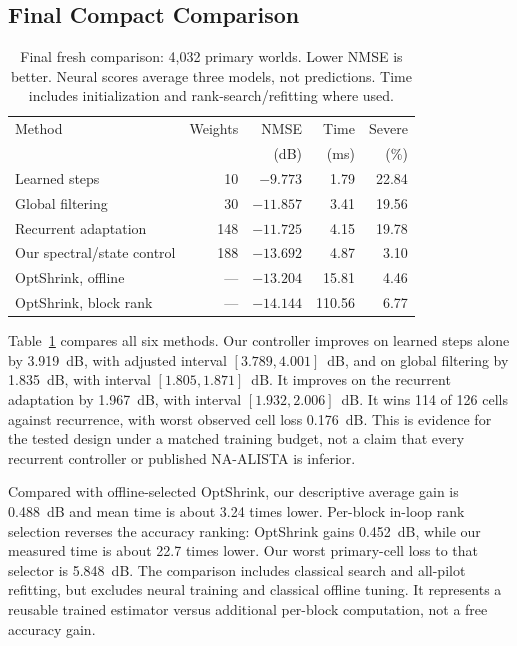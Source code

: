 \documentclass[10pt,journal,letterpaper]{IEEEtran}
\begin{document}
\subsection{Final Compact Comparison}
\begin{table}[!t]
\caption{Final fresh comparison: 4,032 primary worlds. Lower NMSE is better. Neural scores average three models, not predictions. Time includes initialization and rank-search/refitting where used.}
\label{tab:compact}\centering\footnotesize\setlength{\tabcolsep}{3pt}
\begin{tabular}{@{}lrrrr@{}}\toprule
Method & Weights & NMSE & Time & Severe\\
 & & (dB) & (ms) & (\%)\\\midrule
Learned steps & 10 & $-9.773$ & 1.79 & 22.84\\
Global filtering & 30 & $-11.857$ & 3.41 & 19.56\\
Recurrent adaptation & 148 & $-11.725$ & 4.15 & 19.78\\
Our spectral/state control & 188 & $-13.692$ & 4.87 & 3.10\\
OptShrink, offline & --- & $-13.204$ & 15.81 & 4.46\\
OptShrink, block rank & --- & $-14.144$ & 110.56 & 6.77\\\bottomrule
\end{tabular}
\end{table}
Table~\ref{tab:compact} compares all six methods. Our controller improves on learned steps alone by 3.919~dB, with adjusted interval $[3.789,4.001]$~dB, and on global filtering by 1.835~dB, with interval $[1.805,1.871]$~dB. It improves on the recurrent adaptation by 1.967~dB, with interval $[1.932,2.006]$~dB. It wins 114 of 126 cells against recurrence, with worst observed cell loss 0.176~dB. This is evidence for the tested design under a matched training budget, not a claim that every recurrent controller or published NA-ALISTA is inferior.

Compared with offline-selected OptShrink, our descriptive average gain is 0.488~dB and mean time is about 3.24 times lower. Per-block in-loop rank selection reverses the accuracy ranking: OptShrink gains 0.452~dB, while our measured time is about 22.7 times lower. Our worst primary-cell loss to that selector is 5.848~dB. The comparison includes classical search and all-pilot refitting, but excludes neural training and classical offline tuning. It represents a reusable trained estimator versus additional per-block computation, not a free accuracy gain.
\end{document}
